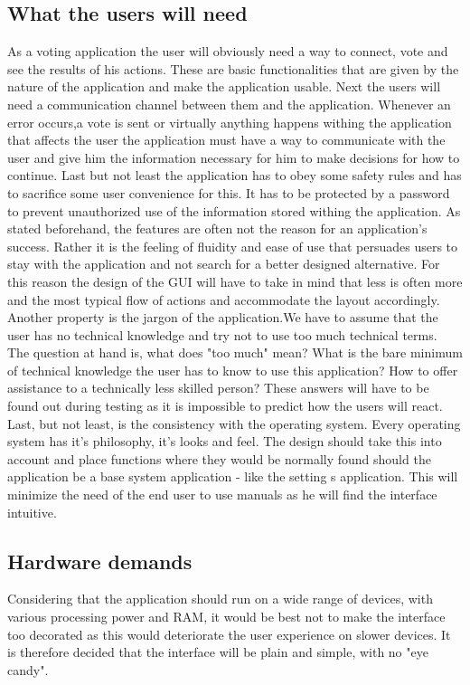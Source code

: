 \documentclass[11pt]{article} %
\begin{document}
\subsection{What the users will need}
As a voting application the user will obviously need a way to connect, vote and see the results of his actions. These are basic functionalities that are given by the nature of the application and make the application usable. Next the users will need a communication channel between them and the application. Whenever an error occurs,a vote is sent or virtually anything happens withing the application that affects the user the application must have a way to communicate with the user and give him the information necessary for him to make decisions for how to continue. Last but not least the application has to obey some safety rules and has to sacrifice some user convenience for this. It has to be protected by a password to prevent unauthorized use of the information stored withing the application.
As stated beforehand, the features are often not the reason for an application's success. Rather it is the feeling of fluidity and ease of use that persuades users to stay with the application and not search for a better designed alternative. For this reason the design of the GUI will have to take in mind that less is often more and the most typical flow of actions and accommodate the layout accordingly. Another property is the jargon of the application.We have to assume that the user has no technical knowledge and try not to use too much technical terms. The question at hand is, what does "too much" mean? What is the bare minimum of technical knowledge the user has to know to use this application? How to offer assistance to a technically less skilled person? These answers will have to be found out during testing as it is impossible to predict how the users will react. Last, but not least, is the consistency with the operating system. Every operating system has it's philosophy, it's looks and feel. The design should take this into account and place functions where they would be normally found should the application be a base system application - like the setting s application. This will minimize the need of the end user to use manuals as he will find the interface intuitive.

\subsection{Hardware demands}
Considering that the application should run on a wide range of devices, with various processing power and RAM, it would be best not to make the interface too decorated as this would deteriorate the user experience on slower devices. It is therefore decided that the interface will be plain and simple, with no "eye candy".
\end{document}
